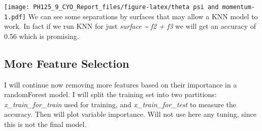 \documentclass[]{article}
\begin{document}
\texttt{[image: PH125\_9\_CYO\_Report\_files/figure-latex/theta psi and momentum-1.pdf]}
We can see some separations by surfaces that may allow a KNN model to
work. In fact if we run KNN for just \emph{surface \textasciitilde{} f2
+ f3} we will get an accuracy of 0.56 which is promising.

\hypertarget{more-feature-selection}{%
\subsection{More Feature Selection}\label{more-feature-selection}}

I will continue now removing more features based on their importance in
a randomForest model. I will split the training set into two partitions:
\emph{x\_train\_for\_train} used for training, and
\emph{x\_train\_for\_test} to measure the accuracy. Then will plot
variable importance. Will not use here any tuning, since this is not the
final model.
\end{document}
